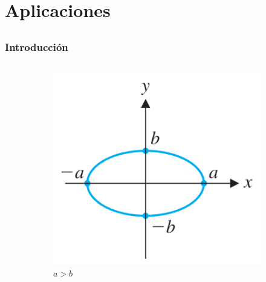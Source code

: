 \section{Aplicaciones}

\subsection{}

\begin{frame}[c]\frametitle{Introducción}		
	
	\begin{columns}[c]
		\hspace{-5mm}
		\begin{column}{0.45\textwidth}
			\begin{figure}
				\centering
				\begin{subfigure}[b]{0.4\textwidth}
					\includegraphics[width=1.4\textwidth]{imagenes/elipse1}
					\caption{$a>b$}
				\end{subfigure}
				\qquad 
				~ %
				\begin{subfigure}[b]{0.4\textwidth}

\end{subfigure}
\end{figure}
\end{column}
\end{columns}
\end{frame}
